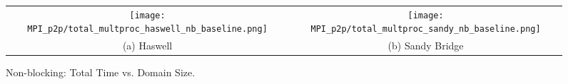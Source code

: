 \begin{enumerate}
	\begin{figure}[p] %
		\begin{tabular}{cc}
			\hspace*{-0.35\linewidth}\texttt{[image: MPI\_p2p/total\_multproc\_haswell\_nb\_baseline.png]} & \hspace*{-0.05\linewidth}\texttt{[image: MPI\_p2p/total\_multproc\_sandy\_nb\_baseline.png]} \\
			\hspace*{-0.45\linewidth}(a) Haswell & \hspace*{-0.15\linewidth}(b) Sandy Bridge\\[6pt]
		\end{tabular}
		\caption{Non-blocking: Total Time vs. Domain Size.}
		\label{fig:total_multproc_nb_baseline}
	\end{figure}

\end{enumerate}

